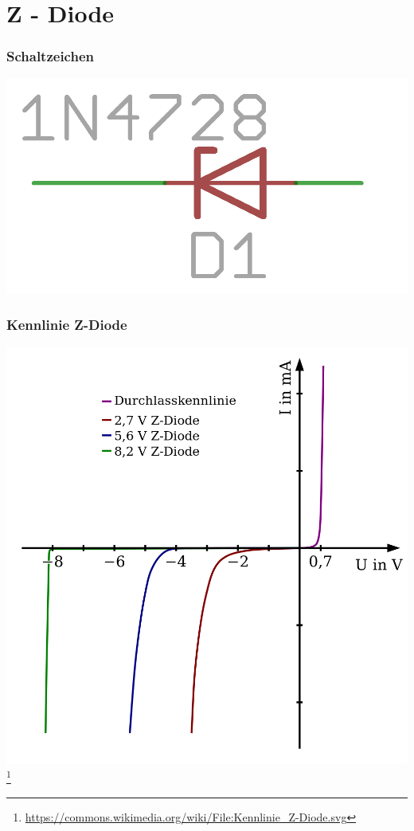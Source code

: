 \section*{Z - Diode}

\begin{frame}
    \frametitle{Schaltzeichen}
    \begin{center}
        \includegraphics[width=.8\textwidth]{e12/z-diode.png}
	\end{center}
\end{frame}

\begin{frame}
    \frametitle{Kennlinie Z-Diode}
    \begin{center}
        \includegraphics[height=.8\textheight]{e12/Kennlinie_Z-Diode.png}
        \footnote{\tiny \url{https://commons.wikimedia.org/wiki/File:Kennlinie_Z-Diode.svg}}
	\end{center}
\end{frame}

